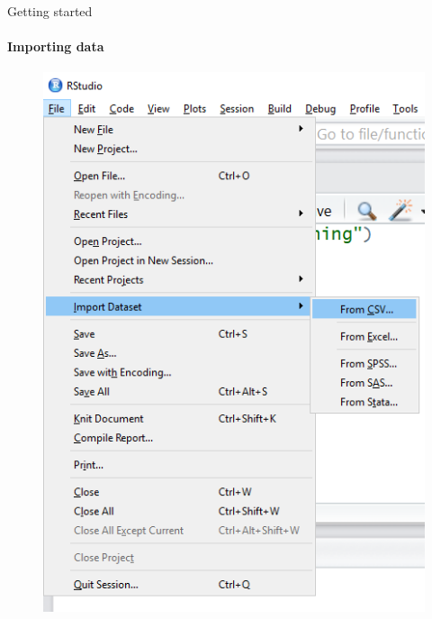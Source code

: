 \documentclass[ignorenonframetext,]{beamer}
\begin{document}
\begin{frame}{Getting started}

\framesubtitle{Importing data}

\begin{figure}
\centering
  \includegraphics[scale=0.45]{img/import_data1.png}
\end{figure}

\end{frame}
\end{document}
